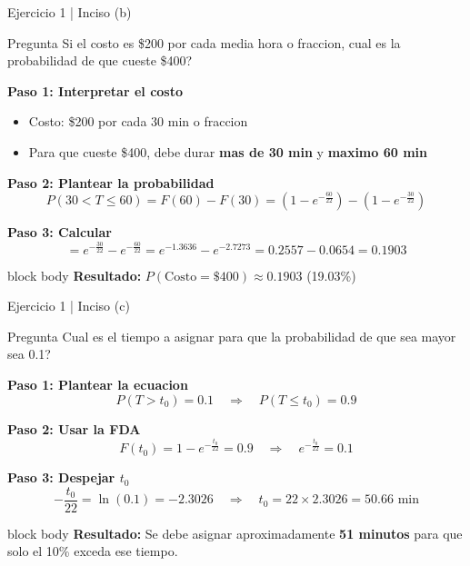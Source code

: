 \documentclass[10pt]{beamer}
\begin{document}
\begin{frame}{Ejercicio 1 | Inciso (b)}
\begin{exampleblock}{Pregunta}
Si el costo es \$200 por cada media hora o fraccion, cual es la probabilidad de que cueste \$400?
\end{exampleblock}

\vspace{0.2cm}
\textbf{Paso 1: Interpretar el costo}
\begin{itemize}
    \item Costo: \$200 por cada 30 min o fraccion
    \item Para que cueste \$400, debe durar \textbf{mas de 30 min} y \textbf{maximo 60 min}
\end{itemize}

\vspace{0.1cm}
\textbf{Paso 2: Plantear la probabilidad}
\[
P(30 < T \leq 60) = F(60) - F(30) = \left(1 - e^{-\frac{60}{22}}\right) - \left(1 - e^{-\frac{30}{22}}\right)
\]

\vspace{0.1cm}
\textbf{Paso 3: Calcular}
\[
= e^{-\frac{30}{22}} - e^{-\frac{60}{22}} = e^{-1.3636} - e^{-2.7273} = 0.2557 - 0.0654 = \boxed{0.1903}
\]

\vspace{0.2cm}
\begin{beamercolorbox}[rounded=true,shadow=true,wd=\linewidth]{block body}
\centering
\textbf{Resultado:} $P(\text{Costo} = \$400) \approx 0.1903$ (19.03\%)
\end{beamercolorbox}
\end{frame}

\begin{frame}{Ejercicio 1 | Inciso (c)}
\begin{exampleblock}{Pregunta}
Cual es el tiempo a asignar para que la probabilidad de que sea mayor sea 0.1?
\end{exampleblock}

\vspace{0.2cm}
\textbf{Paso 1: Plantear la ecuacion}
\[
P(T > t_0) = 0.1 \quad \Rightarrow \quad P(T \leq t_0) = 0.9
\]

\vspace{0.1cm}
\textbf{Paso 2: Usar la FDA}
\[
F(t_0) = 1 - e^{-\frac{t_0}{22}} = 0.9 \quad \Rightarrow \quad e^{-\frac{t_0}{22}} = 0.1
\]

\vspace{0.1cm}
\textbf{Paso 3: Despejar $t_0$}
\[
-\frac{t_0}{22} = \ln(0.1) = -2.3026 \quad \Rightarrow \quad t_0 = 22 \times 2.3026 = \boxed{50.66 \text{ min}}
\]

\vspace{0.2cm}
\begin{beamercolorbox}[rounded=true,shadow=true,wd=\linewidth]{block body}
\centering
\textbf{Resultado:} Se debe asignar aproximadamente \textbf{51 minutos} para que solo el 10\% exceda ese tiempo.
\end{beamercolorbox}
\end{frame}
\end{document}
